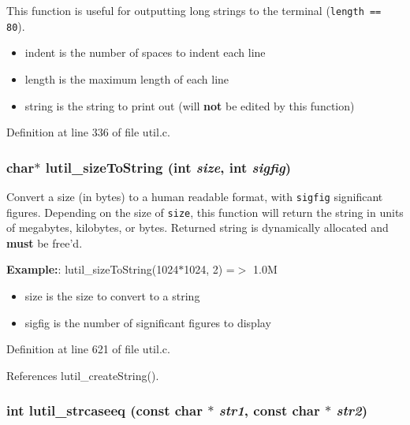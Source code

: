 This function is useful for outputting long strings to the terminal ({\tt length == 80}).

\begin{itemize}
\item indent is the number of spaces to indent each line \item length is the maximum length of each line \item string is the string to print out (will {\bf not} be edited by this function) \end{itemize}


Definition at line 336 of file util.c.
\subsubsection{\setlength{\rightskip}{0pt plus 5cm}char$\ast$ lutil\_\-size\-To\-String (int {\em size}, int {\em sigfig})}\label{util_8c_a21}


Convert a size (in bytes) to a human readable format, with {\tt sigfig} significant figures. Depending on the size of {\tt size}, this function will return the string in units of megabytes, kilobytes, or bytes. Returned string is dynamically allocated and {\bf must} be free'd.

{\bf Example:}: lutil\_\-size\-To\-String(1024$\ast$1024, 2) =$>$ 1.0M

\begin{itemize}
\item size is the size to convert to a string \item sigfig is the number of significant figures to display 
\end{itemize}


Definition at line 621 of file util.c.

References lutil\_\-create\-String().
\subsubsection{\setlength{\rightskip}{0pt plus 5cm}int lutil\_\-strcaseeq (const char $\ast$ {\em str1}, const char $\ast$ {\em str2})\hspace{0.3cm}{\tt  [inline]}}\label{util_8c_a1}



